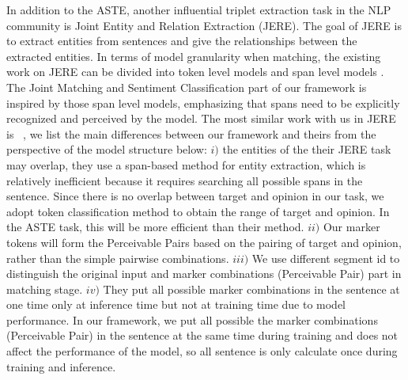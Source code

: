 \documentclass[11pt]{article}
\begin{document}
In addition to the ASTE, another influential triplet extraction task in the NLP community is Joint Entity and Relation Extraction (JERE). The goal of JERE is to extract entities from sentences and give the relationships between the extracted entities. In terms of model granularity when matching, the existing work on JERE can be divided into token level models \cite{zhang2017end,zheng2017joint} and span level models  \cite{wadden2019entity,zhong2020frustratingly}. 
The Joint Matching and Sentiment Classification part of our framework is inspired by those span level models, emphasizing that spans need to be explicitly recognized and perceived by the model. 
The most similar work with us in JERE is ~\citet{zhong2020frustratingly}, we list the main differences between our framework and theirs from the perspective of the model structure below: {$i)$} the entities of the their JERE task may overlap, they use a span-based method for entity extraction, which is relatively inefficient because it requires searching all possible spans in the sentence. Since there is no overlap between target and opinion in our task,  we adopt token classification method to obtain the range of target and opinion. In the ASTE task, this will be more efficient than their method.
{$ii)$} Our marker tokens will form the Perceivable Pairs based on the pairing of target and opinion, rather than the simple pairwise combinations.
{$iii)$} We use different segment id to distinguish the original input and marker combinations (Perceivable Pair) part in matching stage. 
{$iv)$} They put all possible marker combinations in the sentence at one time only at inference time but not at training time due to model performance. In our framework, we put all possible the marker combinations (Perceivable Pair) in the sentence at the same time during training and does not affect the performance of the model, so all sentence is only calculate once during training and inference.
\end{document}
